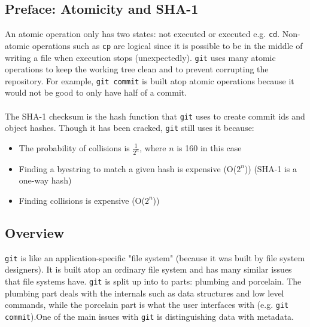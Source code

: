 \documentclass[13pt]{article}
\begin{document}
\subsection{Preface: Atomicity and SHA-1}
An atomic operation only has two states: not executed or executed e.g. \texttt{cd}. Non-atomic operations such as \texttt{cp} are logical since it is possible to be in the middle of writing a file when execution stops (unexpectedly). \texttt{git} uses many atomic operations to keep the working tree clean and to prevent corrupting the repository. For example, \texttt{git commit} is built atop atomic operations because it would not be good to only have half of a commit. \\ \\
The SHA-1 checksum is the hash function that \texttt{git} uses to create commit ids and object hashes. Though it has been cracked, \texttt{git} still uses it because:
\begin{itemize}[label=]
\item The probability of collisions is $\frac{1}{2^n}$, where $n$ is 160 in this case
\item Finding a byestring to match a given hash is expensive (O($2^n$)) (SHA-1 is a one-way hash)
\item Finding collisions is expensive (O($2^n$))
\end{itemize}





\subsection{Overview}
\texttt{git} is like an application-specific "file system" (because it was built by file system designers). It is built atop an ordinary file system and has many similar issues that file systems have. \texttt{git} is split up into to parts: plumbing and porcelain. The plumbing part deals with the internals such as data structures and low level commands, while the porcelain part is what the user interfaces with (e.g. \texttt{git commit}).One of the main issues with \texttt{git} is distinguishing data with metadata.
\end{document}
